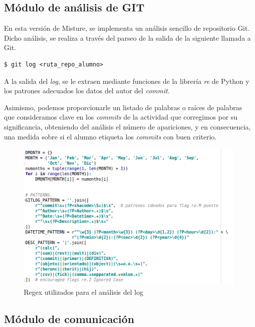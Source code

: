 \subsection{Módulo de análisis de GIT}


En esta versión de Misture, se implementa un análisis sencillo de repositorio Git. Dicho análisis, se realiza a través del parseo de la salida de la siguiente llamada a Git.
\begin{center}
\begin{verbatim}
$ git log <ruta_repo_alumno>
\end{verbatim}
\end{center}
A la salida del \textit{log}, se le extraen mediante funciones de la librería \textit{re} de Python y los patrones adecuados los datos del autor del \textit{commit}.


Asimismo, podemos proporcionarle un listado de palabras o raíces de palabras que consideramos clave en los \textit{commits} de la actividad que corregimos por su significancia, obteniendo  del análisis el número de apariciones, y en consecuencia, una medida sobre si el alumno etiqueta los \textit{commits} con buen criterio.


\begin{figure}[H]
   \centering
   \includegraphics[width=16cm]{img/Selection_025_gitlog_patterns}
   \caption{Regex utilizados para el análisis del log}
   \label{figura:reg_analisis_log}
\end{figure}

\subsection{Módulo de comunicación}

